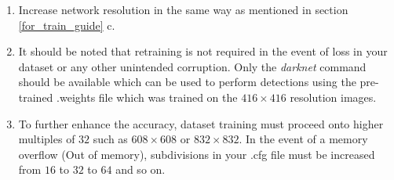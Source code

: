 \begin{enumerate}
  \item Increase network resolution in the same way as mentioned in section \ref{for_train_guide} c.
  \item It should be noted that retraining is not required in the event of loss in your dataset or any other unintended corruption. Only the \textit{darknet} command should be available which can be used to perform detections using the pre-trained {\selectfont .weights} file which was trained on the $416 \times 416$ resolution images.
  \item To further enhance the accuracy, dataset training must proceed onto higher multiples of  $32$ such as $608 \times 608$ or $832 \times 832$. In the event of a memory overflow ({\selectfont Out of memory}), {\selectfont subdivisions} in your {\selectfont .cfg} file must be increased from $16$ to $32$ to $64$ and so on.
\end{enumerate}
